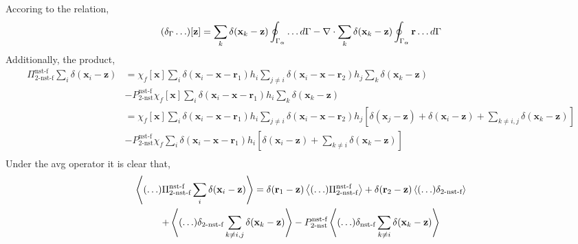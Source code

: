 Accoring to the relation, 
\begin{equation}
    (\delta_\Gamma \ldots)[\textbf{z}]
    =
    \sum_k \delta(\textbf{x}_k - \textbf{z}) \oint_{\Gamma_{\alpha}} \ldots d\Gamma
    - \mathbf{\nabla}\cdot \sum_k \delta(\textbf{x}_k - \textbf{z}) \oint_{\Gamma_{\alpha}} \textbf{r}\ldots d\Gamma
\end{equation}
Additionally, the product, 
\begin{align}
    \Pi_\text{2-nst-f}^\text{nst-f}
    \sum_i \delta(\textbf{x}_i - \textbf{z}) 
    &= 
    \chi_f[\textbf{x}] 
    \sum_i \delta(\textbf{x}_i-\textbf{x}-\textbf{r}_1)h_i
    \sum_{j\neq i} \delta(\textbf{x}_i-\textbf{x}-\textbf{r}_2)h_j
    \sum_k \delta(\textbf{x}_k - \textbf{z}) \\
    &- 
    P^\text{nst-f}_\text{2-nst}\chi_f[\textbf{x}] 
    \sum_i \delta(\textbf{x}_i-\textbf{x}-\textbf{r}_1)h_i
    \sum_k \delta(\textbf{x}_k - \textbf{z}) \\
    &= 
    \chi_f[\textbf{x}] 
    \sum_i \delta(\textbf{x}_i-\textbf{x}-\textbf{r}_1)h_i
    \sum_{j\neq i} \delta(\textbf{x}_i-\textbf{x}-\textbf{r}_2)h_j
    [ \delta(\textbf{x}_j - \textbf{z}) +  \delta(\textbf{x}_i - \textbf{z})  + \sum_{k\neq i,j} \delta(\textbf{x}_k - \textbf{z}) ]\\
    &- P^\text{nst-f}_\text{2-nst}\chi_f
    \sum_i \delta(\textbf{x}_i-\textbf{x}-\textbf{r}_1)h_i
    [\delta(\textbf{x}_i - \textbf{z})  + \sum_{k\neq i} \delta(\textbf{x}_k - \textbf{z}) ]\\
\end{align}
Under the avg operator it is clear that, 
\begin{multline}
    \left<(\ldots)\Pi_\text{2-nst-f}^\text{nst-f} \sum_i \delta(\textbf{x}_i - \textbf{z}) \right>
    =
    \delta(\textbf{r}_1 - \textbf{z}) \left<(\ldots)\Pi_\text{2-nst-f}^\text{nst-f} \right>
    +\delta(\textbf{r}_2 - \textbf{z}) \left<(\ldots)\delta_\text{2-nst-f}\right>\\
    + \left<(\ldots)\delta_\text{2-nst-f} \sum_{k\neq i,j} \delta(\textbf{x}_k - \textbf{z}) \right>
    - P^\text{nst-f}_\text{2-nst} \left<(\ldots) \delta_\text{nst-f} \sum_{k\neq i} \delta(\textbf{x}_k - \textbf{z}) \right>\\
\end{multline}

